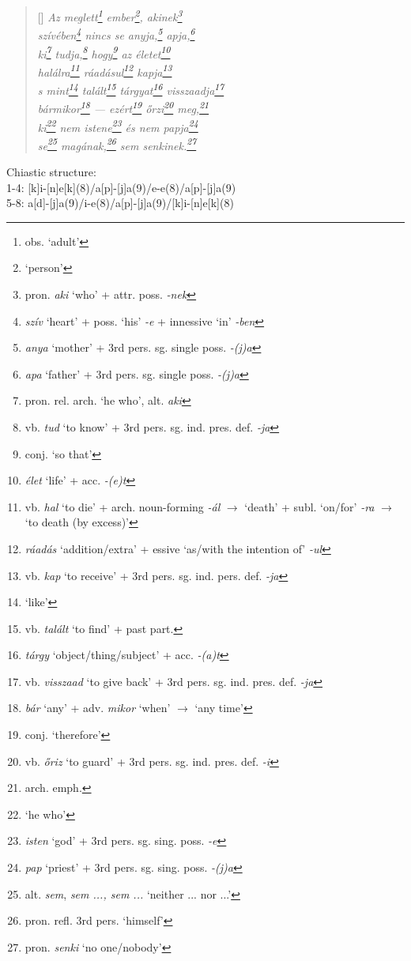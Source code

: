 \documentclass[a4paper,12pt,twoside,final]{book}
\begin{document}
\begin{verse}[\versewidth]
  \it
  Az meglett\footnote{obs. `adult'} ember\footnote{`person'},
  akinek\footnote{pron. \emph{aki} `who' + attr. poss. \emph{-nek}} \\
  szívében\footnote{\emph{szív} `heart' + poss. `his' \emph{-e} +
  innessive `in' \emph{-ben}} nincs se anyja,\footnote{\emph{anya}
  `mother' + 3rd pers. sg. single poss. \emph{-(j)a}}
  apja,\footnote{\emph{apa} `father' + 3rd pers. sg. single
  poss. \emph{-(j)a}} \\
  ki\footnote{pron. rel. arch. `he who', alt. \emph{aki}}
  tudja,\footnote{vb. \emph{tud} `to know' + 3rd
  pers. sg. ind. pres. def. \emph{-ja}}
  hogy\footnote{conj. `so that'} az életet\footnote{\emph{élet}
  `life' + acc. \emph{-(e)t}} \\
  halálra\footnote{vb. \emph{hal} `to die' + arch. noun-forming
  \emph{-ál} $\rightarrow$ `death' + subl. `on/for' \emph{-ra}
  $\rightarrow$ `to death (by excess)'}
  ráadásul\footnote{\emph{ráadás} `addition/extra' + essive
  `as/with the intention of' \emph{-ul}}
  kapja\footnote{vb. \emph{kap} `to receive' + 3rd
  pers. sg. ind. pers. def. \emph{-ja}} \\
  s mint\footnote{`like'} talált\footnote{vb. \emph{talált} `to
  find' + past part.} tárgyat\footnote{\emph{tárgy}
  `object/thing/subject' + acc. \emph{-(a)t}}
  visszaadja\footnote{vb. \emph{visszaad} `to give back' + 3rd
  pers. sg. ind. pres. def. \emph{-ja}} \\
  bármikor\footnote{\emph{bár} `any' + adv. \emph{mikor} `when'
  $\rightarrow$ `any time'} --- ezért\footnote{conj. `therefore'}
  őrzi\footnote{vb. \emph{őriz} `to guard' + 3rd
  pers. sg. ind. pres. def. \emph{-i}} meg,\footnote{arch. emph.} \\
  ki\footnote{`he who'} nem istene\footnote{\emph{isten} `god' +
  3rd pers. sg. sing. poss. \emph{-e}} és nem
  papja\footnote{\emph{pap} `priest' + 3rd
  pers. sg. sing. poss. \emph{-(j)a}} \\
  se\footnote{alt. \emph{sem}, \emph{sem ..., sem ...}  `neither
  ... nor ...'} magának,\footnote{pron. refl. 3rd pers. `himself'}
  sem senkinek.\footnote{pron. \emph{senki} `no one/nobody'} \\
\end{verse}

\noindent Chiastic structure: \\
1-4: [k]i-[n]e[k](8)/a[p]-[j]a(9)/e-e(8)/a[p]-[j]a(9)\\
5-8: a[d]-[j]a(9)/i-e(8)/a[p]-[j]a(9)/[k]i-[n]e[k](8)
\end{document}
